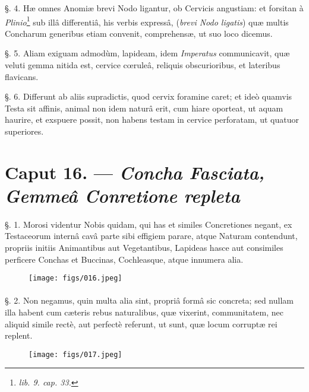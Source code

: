 \documentclass[a4paper, 11pt, oneside, polutonikogreek, german]{article}
\begin{document}
§. 4. Hæ omnes Anomiæ brevi Nodo ligantur, ob Cervicis angustiam: et forsitan à \emph{Plinio}\footnote{\emph{lib. 9. cap. 33.}} sub illâ differentiâ, his verbis expressâ, (\emph{brevi Nodo ligatis}) quæ multis Concharum generibus etiam convenit, comprehensæ, ut suo loco dicemus.

§. 5. Aliam exiguam admodùm, lapideam, idem \emph{Imperatus} communicavit, quæ veluti gemma nitida est, cervice cœruleâ, reliquis obscurioribus, et lateribus flavicans.

§. 6. Differunt ab aliis supradictis, quod cervix foramine caret; et ideò quamvis Testa sit affinis, animal non idem naturâ erit, cum hiare oporteat, ut aquam haurire, et exspuere possit, non habens testam in cervice perforatam, ut quatuor superiores.

\section{Caput 16. --- \emph{Concha Fasciata, Gemmeâ Conretione repleta}}
\paragraph{}
§. 1. Morosi videntur Nobis quidam, qui has et similes Concretiones negant, ex Testaceorum internâ cavâ parte sibi effigiem parare, atque Naturam contendunt, propriis initiis Animantibus aut Vegetantibus, Lapideas hasce aut consimiles perficere Conchas et Buccinas, Cochleasque, atque innumera alia.

\begin{figure}[H]
\centering
\texttt{[image: figs/016.jpeg]}

\end{figure}
\paragraph{}
§. 2. Non negamus, quin multa alia sint, propriâ formâ sic concreta; sed nullam illa habent cum cæteris rebus naturalibus, quæ vixerint, communitatem, nec aliquid simile rectè, aut perfectè referunt, ut sunt, quæ locum corruptæ rei replent.

\begin{figure}[H]
\centering
\texttt{[image: figs/017.jpeg]}

\end{figure}
\end{document}
